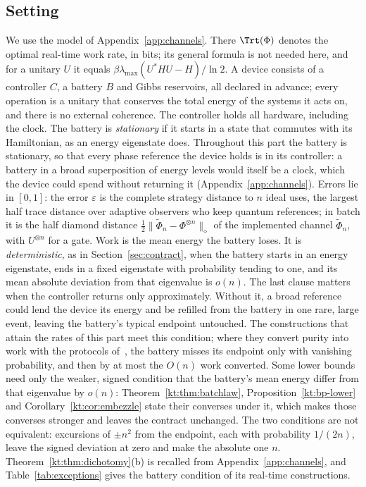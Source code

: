\subsection{Setting}\label{kt:sec:setting}

We use the model of Appendix~\ref{app:channels}. There $\Trt(\Phi)$ denotes the optimal real-time work rate, in bits; its general formula is not needed here, and for a unitary $U$ it equals $\beta\lambda_{\max}(U^*HU-H)/\ln2$. A device consists of a controller $C$, a battery $B$ and Gibbs reservoirs, all declared in advance; every operation is a unitary that conserves the total energy of the systems it acts on, and there is no external coherence. The controller holds all hardware, including the clock. The battery is \emph{stationary} if it starts in a state that commutes with its Hamiltonian, as an energy eigenstate does. Throughout this part the battery is stationary, so that every phase reference the device holds is in its controller: a battery in a broad superposition of energy levels would itself be a clock, which the device could spend without returning it (Appendix~\ref{app:channels}). Errors lie in $[0,1]$: the error $\varepsilon$ is the complete strategy distance to $n$ ideal uses, the largest half trace distance over adaptive observers who keep quantum references; in batch it is the half diamond distance $\tfrac12\|\widetilde\Phi_n-\Phi^{\otimes n}\|_\diamond$ of the implemented channel $\widetilde\Phi_n$, with $U^{\otimes n}$ for a gate. Work is the mean energy the battery loses. It is \emph{deterministic}, as in Section~\ref{sec:contract}, when the battery starts in an energy eigenstate, ends in a fixed eigenstate with probability tending to one, and its mean absolute deviation from that eigenvalue is $o(n)$. The last clause matters when the controller returns only approximately. Without it, a broad reference could lend the device its energy and be refilled from the battery in one rare, large event, leaving the battery's typical endpoint untouched. The constructions that attain the rates of this part meet this condition; where they convert purity into work with the protocols of~\cite{HorodeckiOppenheim13}, the battery misses its endpoint only with vanishing probability, and then by at most the $O(n)$ work converted. Some lower bounds need only the weaker, signed condition that the battery's mean energy differ from that eigenvalue by $o(n)$: Theorem~\ref{kt:thm:batchlaw}, Proposition~\ref{kt:bp-lower} and Corollary~\ref{kt:cor:embezzle} state their converses under it, which makes those converses stronger and leaves the contract unchanged. The two conditions are not equivalent: excursions of $\pm n^2$ from the endpoint, each with probability $1/(2n)$, leave the signed deviation at zero and make the absolute one $n$. Theorem~\ref{kt:thm:dichotomy}(b) is recalled from Appendix~\ref{app:channels}, and Table~\ref{tab:exceptions} gives the battery condition of its real-time constructions.

